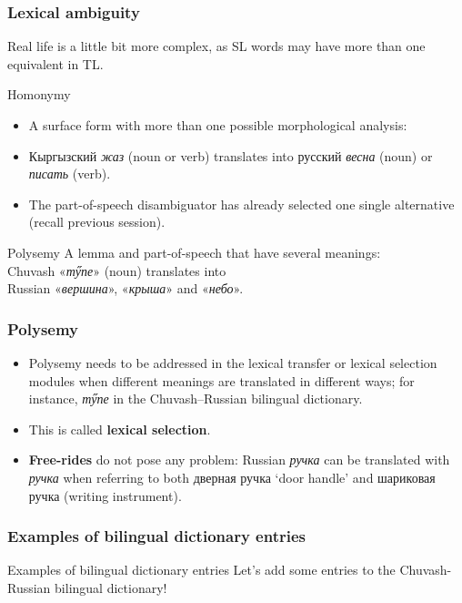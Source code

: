 \documentclass[10pt,xetex]{beamer} %
\begin{document}
\begin{frame}
  \frametitle{Lexical ambiguity}

Real life is a little bit more complex, as SL words may have more than one equivalent in TL.

\begin{block}{Homonymy}
\begin{itemize}
\item A surface form with more than one possible morphological analysis:
\item Кыргызский {\em жаз} (noun or verb) translates into русский {\em весна} (noun) or {\em писать} (verb).
\item The part-of-speech disambiguator has already selected one single alternative (recall previous session).
\end{itemize}
\end{block}
\begin{block}{Polysemy}%
A lemma and part-of-speech that have several meanings:\\ Chuvash «{\em тӳпе}» (noun) translates into \\
Russian «{\em вершина}», «{\em крыша}» and «{\em небо}».
\end{block}
\end{frame}

\begin{frame}
  \frametitle{Polysemy}%

\begin{itemize}
\item Polysemy needs to be addressed in the lexical transfer or lexical selection modules when different meanings are translated in different ways; for instance, {\em тӳпе} in the Chuvash--Russian bilingual dictionary.
\item This is called {\bf lexical selection}.
\item {\bf Free-rides} do not pose any problem: Russian {\em ручка} can be translated with {\em ручка} when referring to both дверная ручка `door handle' and шариковая ручка (writing instrument).
\end{itemize}


\end{frame}

\begin{frame}
  \frametitle{Examples of bilingual dictionary entries}%

\begin{block}{Examples of bilingual dictionary entries}
Let's add some entries to the Chuvash-Russian bilingual dictionary!
\end{block}
\end{frame}
\end{document}
